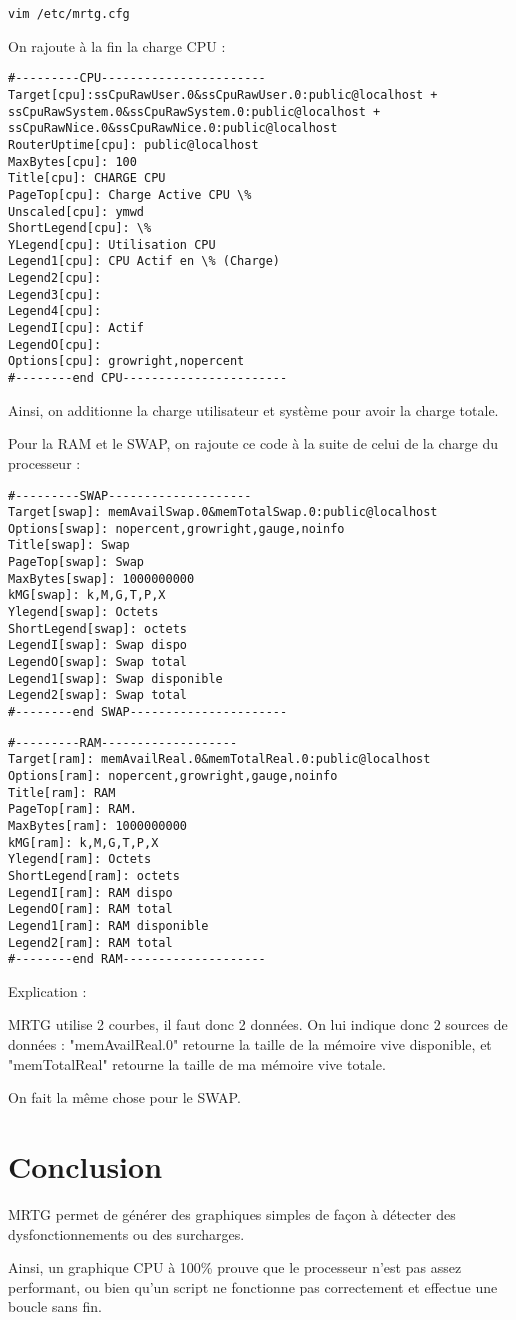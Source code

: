 \begin{verbatim}
vim /etc/mrtg.cfg
\end{verbatim}


On rajoute à la fin la charge CPU : 

\begin{verbatim}
#---------CPU-----------------------
Target[cpu]:ssCpuRawUser.0&ssCpuRawUser.0:public@localhost + ssCpuRawSystem.0&ssCpuRawSystem.0:public@localhost + ssCpuRawNice.0&ssCpuRawNice.0:public@localhost
RouterUptime[cpu]: public@localhost 
MaxBytes[cpu]: 100 
Title[cpu]: CHARGE CPU
PageTop[cpu]: Charge Active CPU \% 
Unscaled[cpu]: ymwd 
ShortLegend[cpu]: \% 
YLegend[cpu]: Utilisation CPU
Legend1[cpu]: CPU Actif en \% (Charge) 
Legend2[cpu]: 
Legend3[cpu]: 
Legend4[cpu]: 
LegendI[cpu]: Actif 
LegendO[cpu]: 
Options[cpu]: growright,nopercent
#--------end CPU-----------------------
\end{verbatim}


Ainsi, on additionne la charge utilisateur et système pour avoir la charge totale.

Pour la RAM et le SWAP, on rajoute ce code à la suite de celui de la charge du processeur :

\begin{verbatim}
#---------SWAP--------------------
Target[swap]: memAvailSwap.0&memTotalSwap.0:public@localhost
Options[swap]: nopercent,growright,gauge,noinfo
Title[swap]: Swap
PageTop[swap]: Swap
MaxBytes[swap]: 1000000000
kMG[swap]: k,M,G,T,P,X
Ylegend[swap]: Octets
ShortLegend[swap]: octets
LegendI[swap]: Swap dispo
LegendO[swap]: Swap total
Legend1[swap]: Swap disponible
Legend2[swap]: Swap total
#--------end SWAP----------------------
\end{verbatim}


\begin{verbatim}
#---------RAM-------------------
Target[ram]: memAvailReal.0&memTotalReal.0:public@localhost
Options[ram]: nopercent,growright,gauge,noinfo
Title[ram]: RAM
PageTop[ram]: RAM.
MaxBytes[ram]: 1000000000
kMG[ram]: k,M,G,T,P,X
Ylegend[ram]: Octets
ShortLegend[ram]: octets
LegendI[ram]: RAM dispo
LegendO[ram]: RAM total
Legend1[ram]: RAM disponible
Legend2[ram]: RAM total
#--------end RAM--------------------
\end{verbatim}

Explication :

MRTG utilise 2 courbes, il faut donc 2 données. On lui indique donc 2 sources de données : "memAvailReal.0" retourne la taille de la mémoire vive disponible, et "memTotalReal" retourne la taille de ma mémoire vive totale.

On fait la même chose pour le SWAP.

\section{Conclusion}

MRTG permet de générer des graphiques simples de façon à détecter des dysfonctionnements ou des surcharges.

Ainsi, un graphique CPU à 100\% prouve que le processeur n'est pas assez performant, ou bien qu'un script ne fonctionne pas correctement et effectue une boucle sans fin.


